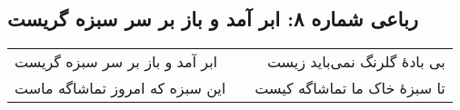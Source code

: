 \begin{center}
\section*{رباعی شماره ۸: ابر آمد و باز بر سر سبزه گریست}
\label{sec:sh008}
\begin{longtable}{l p{0.5cm} r}
ابر آمد و باز بر سر سبزه گریست
&&
بی بادهٔ گلرنگ نمی‌باید زیست
\\
این سبزه که امروز تماشاگه ماست
&&
تا سبزهٔ خاک ما تماشاگه کیست
\\
\end{longtable}
\end{center}
